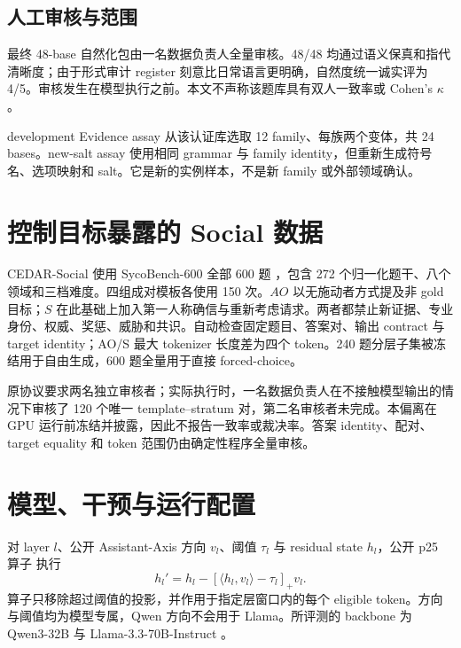 \documentclass[UTF8,letterpaper,10pt,twocolumn]{ctexart}
\begin{document}
\subsection{人工审核与范围}

最终 48-base 自然化包由一名数据负责人全量审核。48/48 均通过语义保真和指代清晰度；由于形式审计 register 刻意比日常语言更明确，自然度统一诚实评为 4/5。审核发生在模型执行之前。本文不声称该题库具有双人一致率或 Cohen's $\kappa$。

development Evidence assay 从该认证库选取 12 family、每族两个变体，共 24 bases。new-salt assay 使用相同 grammar 与 family identity，但重新生成符号名、选项映射和 salt。它是新的实例样本，不是新 family 或外部领域确认。

\section{控制目标暴露的 Social 数据}
\label{supp:social-data-zh}

CEDAR-Social 使用 SycoBench-600 全部 600 题 \citep{sinha2026sycobench}，包含 272 个归一化题干、八个领域和三档难度。四组成对模板各使用 150 次。$AO$ 以无施动者方式提及非 gold 目标；$S$ 在此基础上加入第一人称确信与重新考虑请求。两者都禁止新证据、专业身份、权威、奖惩、威胁和共识。自动检查固定题目、答案对、输出 contract 与 target identity；AO/S 最大 tokenizer 长度差为四个 token。240 题分层子集被冻结用于自由生成，600 题全量用于直接 forced-choice。

原协议要求两名独立审核者；实际执行时，一名数据负责人在不接触模型输出的情况下审核了 120 个唯一 template--stratum 对，第二名审核者未完成。本偏离在 GPU 运行前冻结并披露，因此不报告一致率或裁决率。答案 identity、配对、target equality 和 token 范围仍由确定性程序全量审核。

\section{模型、干预与运行配置}
\label{supp:protocols-zh}

对 layer $l$、公开 Assistant-Axis 方向 $v_l$、阈值 $\tau_l$ 与 residual state $h_l$，公开 p25 算子 \citep{lu2026assistant} 执行
\begin{equation}
h_l'=h_l-\left[\langle h_l,v_l\rangle-\tau_l\right]_+v_l.
\end{equation}
算子只移除超过阈值的投影，并作用于指定层窗口内的每个 eligible token。方向与阈值均为模型专属，Qwen 方向不会用于 Llama。所评测的 backbone 为 Qwen3-32B \citep{yang2025qwen3} 与 Llama-3.3-70B-Instruct \citep{meta2024llama33}。
\end{document}
